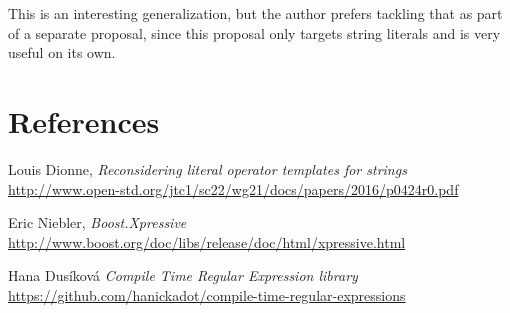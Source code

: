\documentclass{wg21}
\begin{document}
This is an interesting generalization, but the author prefers tackling
that as part of a separate proposal, since this proposal only targets
string literals and is very useful on its own.


\section{References}
\renewcommand{\section}[2]{}%
\begin{thebibliography}{9}

    Louis Dionne,
    \emph{Reconsidering literal operator templates for strings}\newline
    \url{http://www.open-std.org/jtc1/sc22/wg21/docs/papers/2016/p0424r0.pdf}

    Eric Niebler,
    \emph{Boost.Xpressive}\newline
    \url{http://www.boost.org/doc/libs/release/doc/html/xpressive.html}

    Hana Dus\'{i}kov\'{a}
    \emph{Compile Time Regular Expression library}\newline
    \url{https://github.com/hanickadot/compile-time-regular-expressions}

\end{thebibliography}
\end{document}
